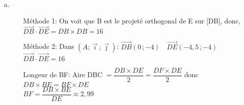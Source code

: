 \documentclass[12pt, a4paper]{article}
\begin{document}
\begin{Exercise}[number={63}]
\begin{enumerate}[a)]
\begin{itemize}[leftmargin=3cm]
                    \end{itemize} \bigbreak
        \item \begin{itemize}[leftmargin=3cm]
                        \item[Méthode 1:] On voit que B est le projeté orthogonal de E sur [DB], donc, \medskip \\ $\overrightarrow{DB}\cdot\overrightarrow{DE}=DB\times DB=16$ \bigbreak
                        \item[Méthode 2:] Dans $(A;\overrightarrow{\imath};\overrightarrow{\jmath})$: $\overrightarrow{DB}(0\,;-4) \quad \overrightarrow{DE}(-4{,}5\,;-4)$ \smallskip \\ $\overrightarrow{DB}\cdot\overrightarrow{DE}=16$ \bigbreak
                        \item[Longeur de BF:] Aire DBC $=\dfrac{DB\times DE}{2}=\dfrac{DF\times DE}{2}$ donc $DB\times BE=BF\times DE$ \medskip \\ $BF=\dfrac{DB\times BE}{DE}\approx2{,}99$
                    \end{itemize}
    \end{enumerate}  
\end{Exercise}

\pagebreak
\end{document}
